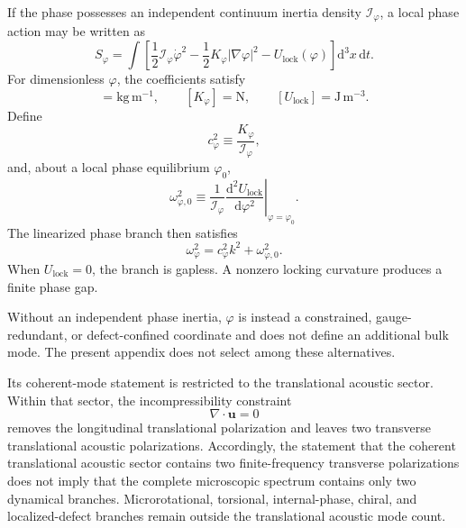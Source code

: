 If the phase possesses an independent continuum inertia density \(\mathcal I_{\varphi}\), a local phase action may be written as
\begin{equation}
    S_{\varphi}
    =
    \int
    \left[
    \frac{1}{2}\mathcal I_{\varphi}\dot\varphi^2
    -\frac{1}{2}K_{\varphi}|\nabla\varphi|^2
    -U_{\mathrm{lock}}(\varphi)
    \right]
    \mathrm d^3x\,\mathrm dt.
\end{equation}
For dimensionless \(\varphi\), the coefficients satisfy
\begin{equation}
    [\mathcal I_{\varphi}]=\mathrm{kg\,m^{-1}},
    \qquad
    [K_{\varphi}]=\mathrm N,
    \qquad
    [U_{\mathrm{lock}}]=\mathrm{J\,m^{-3}}.
\end{equation}
Define
\begin{equation}
    c_{\varphi}^2
    \equiv
    \frac{K_{\varphi}}{\mathcal I_{\varphi}},
\end{equation}
and, about a local phase equilibrium \(\varphi_0\),
\begin{equation}
    \omega_{\varphi,0}^2
    \equiv
    \frac{1}{\mathcal I_{\varphi}}
    \left.
    \frac{\mathrm d^2U_{\mathrm{lock}}}{\mathrm d\varphi^2}
    \right|_{\varphi=\varphi_0}.
\end{equation}
The linearized phase branch then satisfies
\begin{equation}
    \omega_{\varphi}^2
    =
    c_{\varphi}^2k^2
    +\omega_{\varphi,0}^2.
\end{equation}
When \(U_{\mathrm{lock}}=0\), the branch is gapless. A nonzero locking curvature produces a finite phase gap.

Without an independent phase inertia, \(\varphi\) is instead a constrained, gauge-redundant, or defect-confined coordinate and does not define an additional bulk mode. The present appendix does not select among these alternatives.

Its coherent-mode statement is restricted to the translational acoustic sector. Within that sector, the incompressibility constraint
\begin{equation}
    \nabla\cdot\mathbf u=0
\end{equation}
removes the longitudinal translational polarization and leaves two transverse translational acoustic polarizations. Accordingly, the statement that the coherent translational acoustic sector contains two finite-frequency transverse polarizations does not imply that the complete microscopic spectrum contains only two dynamical branches. Microrotational, torsional, internal-phase, chiral, and localized-defect branches remain outside the translational acoustic mode count.

